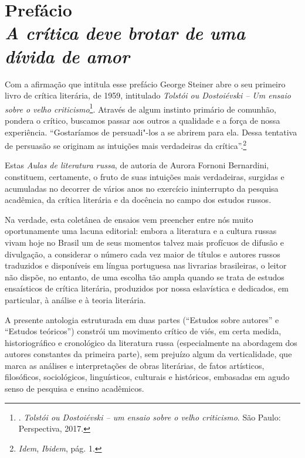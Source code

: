 \chapter*{Prefácio\\
\bigskip
\emph{A crítica deve brotar de uma dívida de amor}}




Com a afirmação que intitula esse prefácio George Steiner abre o seu primeiro livro de crítica
literária, de 1959, intitulado \emph{Tolstói ou Dostoiévski -- Um ensaio
sobre o velho criticismo}\footnote{. \emph{Tolstói ou
  Dostoiévski -- um ensaio sobre o velho criticismo}. São Paulo:
  Perspectiva, 2017.}. Através de algum instinto primário de comunhão,
pondera o crítico, buscamos passar aos outros a qualidade e a força de
nossa experiência. ``Gostaríamos de persuadi"-los a se abrirem para ela.
Dessa tentativa de persuasão se originam as intuições mais verdadeiras
da crítica''.\footnote{\emph{Idem}, \emph{Ibidem}, pág. 1.}

Estas \emph{Aulas de literatura russa}, de autoria de Aurora Fornoni
Bernardini, constituem, certamente, o fruto de suas intuições mais
verdadeiras, surgidas e acumuladas no decorrer de vários anos no
exercício ininterrupto da pesquisa acadêmica, da crítica literária e da
docência no campo dos estudos russos.

Na verdade, esta coletânea de ensaios vem preencher entre nós muito
oportunamente uma lacuna editorial: embora a literatura e a cultura
russas vivam hoje no Brasil um de seus momentos talvez mais profícuos de
difusão e divulgação, a considerar o número cada vez maior de títulos e
autores russos traduzidos e disponíveis em língua portuguesa nas
livrarias brasileiras, o leitor não dispõe, no entanto, de uma escolha
tão ampla quando se trata de estudos ensaísticos de crítica literária,
produzidos por nossa eslavística e dedicados, em particular, à análise e
à teoria literária.

A presente antologia estruturada em duas partes (``Estudos sobre
autores'' e ``Estudos teóricos'') constrói um movimento crítico de viés,
em certa medida, historiográfico e cronológico da literatura russa
(especialmente na abordagem dos autores constantes da primeira parte),
sem prejuízo algum da verticalidade, que marca as análises e
interpretações de obras literárias, de fatos artísticos, filosóficos,
sociológicos, linguísticos, culturais e históricos, embasadas em agudo
senso de pesquisa e ensino acadêmicos.

